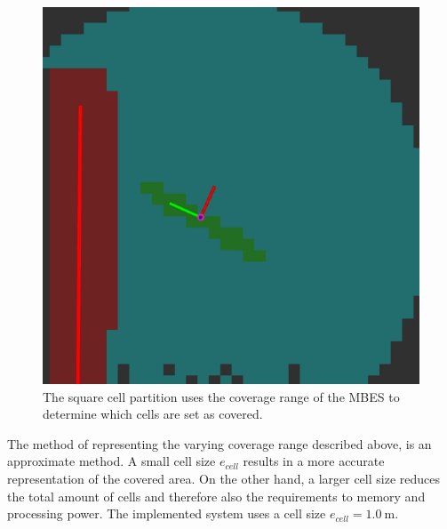 \begin{figure}[h!]
    \centering
	\includegraphics[width=0.5\linewidth]{fig/partition/cover_line}
	\caption{The square cell partition uses the coverage range of the MBES to determine which cells are set as covered. } \label{fig:cover_line}
\end{figure}

The method of representing the varying coverage range described above, is an approximate method. A small cell size $e_{cell}$ results in a more accurate representation of the covered area. On the other hand, a larger cell size reduces the total amount of cells and therefore also the requirements to memory and processing power. The implemented system uses a cell size $e_{cell} = \SI{1.0}{\meter}$.
